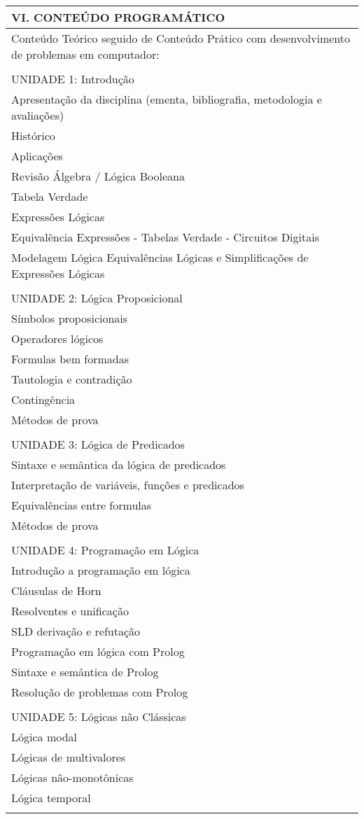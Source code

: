 \documentclass[12pt]{article}
\begin{document}
\begin{longtable}{|L{1.025\textwidth}|} \hline
%
{\bf VI. CONTEÚDO PROGRAMÁTICO } \\ \hline
Conteúdo Teórico seguido de Conteúdo Prático com desenvolvimento de problemas em computador:\\
\\
UNIDADE 1: Introdução\\
 Apresentação da disciplina (ementa, bibliografia, metodologia e avaliações)\\
 Histórico\\
 Aplicações\\
 Revisão Álgebra / Lógica Booleana\\
 Tabela Verdade\\
 Expressões Lógicas\\
 Equivalência Expressões - Tabelas Verdade - Circuitos Digitais\\
 Modelagem Lógica
 Equivalências Lógicas e Simplificações de Expressões Lógicas\\
\\
UNIDADE 2: Lógica Proposicional\\
 Símbolos proposicionais\\
 Operadores lógicos\\
 Formulas bem formadas\\
 Tautologia e contradição\\
 Contingência\\
 Métodos de prova\\
\\
UNIDADE 3: Lógica de Predicados\\
 Sintaxe e semântica da lógica de predicados\\
 Interpretação de variáveis, funções e predicados\\
 Equivalências entre formulas\\
 Métodos de prova\\
\\
UNIDADE 4: Programação em Lógica\\
 Introdução a programação em lógica\\
 Cláusulas de Horn\\
 Resolventes e unificação\\
 SLD derivação e refutação\\
 Programação em lógica com Prolog\\
 Sintaxe e semântica de Prolog\\
 Resolução de problemas com Prolog\\
\\
UNIDADE 5: Lógicas não Clássicas\\
 Lógica modal\\
 Lógicas de multivalores\\
 Lógicas não-monotônicas\\
 Lógica temporal\\

\\ \hline
\end{longtable} 
\end{document}

